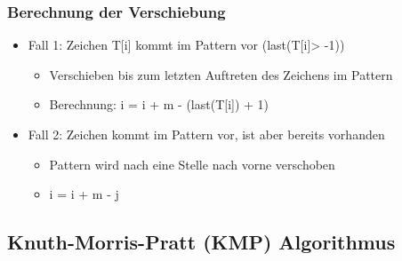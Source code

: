 \subsubsection{Berechnung der Verschiebung}

\begin{itemize}
    \item Fall 1: Zeichen T[i] kommt im Pattern vor (last(T[i]> -1))
    \begin{itemize}
        \item Verschieben bis zum letzten Auftreten des Zeichens im Pattern
        \item Berechnung: i = i + m - (last(T[i]) + 1)
    \end{itemize}
    \item Fall 2: Zeichen kommt im Pattern vor, ist aber bereits vorhanden
    \begin{itemize}
        \item Pattern wird nach eine Stelle nach vorne verschoben
        \item i = i + m - j
    \end{itemize}
\end{itemize}





\subsection{Knuth-Morris-Pratt (KMP) Algorithmus}

